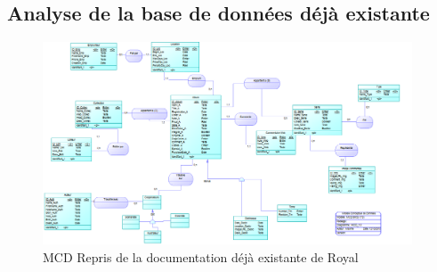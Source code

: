 \subsection{Analyse de la base de données déjà existante}
\begin{figure}[h]
\begin{center}
 \includegraphics[height=6cm]{../img/MCD_Royal.png}
\end{center}
\caption{MCD Repris de la documentation déjà existante de Royal}
\end{figure}
